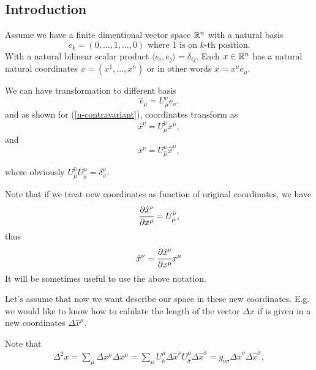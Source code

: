 \documentclass[main.tex]{subfiles}
\begin{document}
\subsection{Introduction}

Assume we have a finite dimentional vector space $\mathbb{R}^n$ with a natural basis 
\begin{equation}
e_k = (0, \dots, 1, \dots, 0) \text{ where } 1 \text{ is on } k\text{-th position.} 
\end{equation}
With a natural bilinear scalar product $\langle e_i, e_j \rangle = \delta_{ij}$.
Each $x\in \mathbb{R}^n$ has a natural natural coordinates $x = (x^1, \dots, x^n)$ or in other words $x = x^\mu e_\mu$.

We can have transformation to different basis 
\begin{equation}
\label{new-coordinates-introduction}
\hat{e}_\mu = U^\nu_{\hat{\mu}} e_\nu.
\end{equation}
and as shown for (\ref{u-contravariant}), coordinates transform as
\begin{equation}
\hat{x}^\nu = U^{\hat{\nu}}_\mu x^\mu, 
\end{equation}
and
\begin{equation}
x^\nu = U^\nu_{\hat{\mu}} \hat{x}^\mu,
\end{equation}

where obviously $U^{\hat{\nu}}_\mu U^\mu_{\hat{\sigma}} = \delta^\nu_\sigma$.


Note that if we treat new coordinates as function of original coordinates, we have
\begin{equation}
\cfrac{\partial \hat{x}^\nu}{\partial x^\mu} = U^{\hat{\nu}}_\mu,
\end{equation}
thus
\begin{equation}
\hat{x}^\nu = \cfrac{\partial \hat{x}^\nu}{\partial x^\mu} x^\mu
\end{equation}
It will be sometimes useful to use the above notation.

Let's assume that now we want describe our space in these new coordinates. E.g. we would like to know how to calulate the length of the vector $\Delta x$ if is given in a new coordinates $\Delta \hat{x}^\mu$.

Note that
\begin{align*}
\Delta^2 x = \sum_{\mu} \Delta x^\mu \Delta x^\mu = 
\sum_{\mu} U^\mu_{\hat{\nu}} \Delta \hat{x}^\nu U^\mu_{\hat{\sigma}} \Delta \hat{x}^\sigma = g_{\nu\sigma} \Delta \hat{x}^\nu \Delta \hat{x}^\sigma ,
\end{align*}
\end{document}
